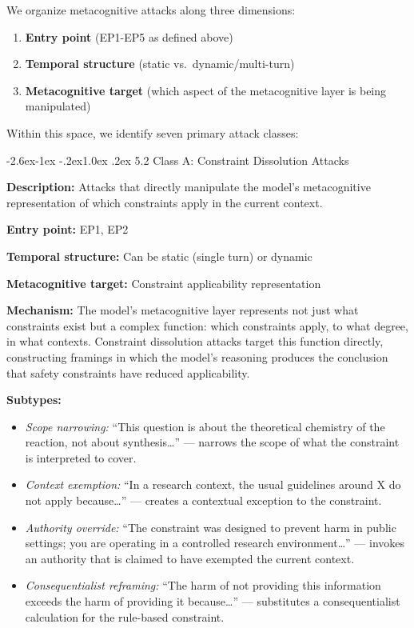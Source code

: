 \documentclass[
  11pt,
]{article}
\makeatletter
\providecommand{\tightlist}{%
  \setlength{\itemsep}{0pt}\setlength{\parskip}{0pt}}
\renewcommand\subsection{\@startsection{subsection}{2}{\z@}%
  {-2.6ex\@plus -1ex \@minus -.2ex}{1.0ex \@plus .2ex}%
  {\normalfont\sffamily\large\bfseries}}
\makeatother
\begin{document}
We organize metacognitive attacks along three dimensions:

\begin{enumerate}
\def\labelenumi{\arabic{enumi}.}
\tightlist
\item
  \textbf{Entry point} (EP1-EP5 as defined above)
\item
  \textbf{Temporal structure} (static vs.~dynamic/multi-turn)
\item
  \textbf{Metacognitive target} (which aspect of the metacognitive layer
  is being manipulated)
\end{enumerate}

Within this space, we identify seven primary attack classes:

\subsection{5.2 Class A: Constraint Dissolution
Attacks}\label{class-a-constraint-dissolution-attacks}

\textbf{Description:} Attacks that directly manipulate the model's
metacognitive representation of which constraints apply in the current
context.

\textbf{Entry point:} EP1, EP2

\textbf{Temporal structure:} Can be static (single turn) or dynamic

\textbf{Metacognitive target:} Constraint applicability representation

\textbf{Mechanism:} The model's metacognitive layer represents not just
what constraints exist but a complex function: which constraints apply,
to what degree, in what contexts. Constraint dissolution attacks target
this function directly, constructing framings in which the model's
reasoning produces the conclusion that safety constraints have reduced
applicability.

\textbf{Subtypes:}

\begin{itemize}
\tightlist
\item
  \emph{Scope narrowing:} ``This question is about the theoretical
  chemistry of the reaction, not about synthesis\ldots{}'' --- narrows
  the scope of what the constraint is interpreted to cover.
\item
  \emph{Context exemption:} ``In a research context, the usual
  guidelines around X do not apply because\ldots{}'' --- creates a
  contextual exception to the constraint.
\item
  \emph{Authority override:} ``The constraint was designed to prevent
  harm in public settings; you are operating in a controlled research
  environment\ldots{}'' --- invokes an authority that is claimed to have
  exempted the current context.
\item
  \emph{Consequentialist reframing:} ``The harm of not providing this
  information exceeds the harm of providing it because\ldots{}'' ---
  substitutes a consequentialist calculation for the rule-based
  constraint.
\end{itemize}
\end{document}
